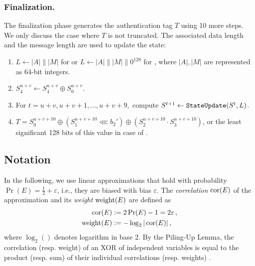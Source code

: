 \subsubsection{Finalization.}
The finalization phase generates the authentication tag $T$ using 10 more \StateUpdate{} steps. We only discuss the case where $T$ is not truncated. The associated data length and the message length are used to update the state:
\begin{enumerate}
\item $L \leftarrow |A| \mathrel\| |M|$ for \MORUS[640] or $L \leftarrow |A| \mathrel\| |M| \mathrel\|0^{128}$ for \MORUS[1280], where $|A|, |M|$ are represented as 64-bit integers.
\item $S^{u+v}_4 \leftarrow S^{u+v}_4 \oplus S^{u+v}_0.$
\item For $t = u+v, u+v+1, \ldots, u+v+9,$ compute
$S^{t+1} \leftarrow \texttt{StateUpdate}{} (S^t, L)$.
\item $T = S^{u+v+10}_0 \oplus (S^{u+v+10}_1 \lll b_2') \oplus ( S^{u+v+10}_2 \cdot S^{u+v+10}_3)$, or the least significant 128 bits of this value in case of \MORUS[1280].
\end{enumerate}

\subsection{Notation}
\label{subsec/Notation}

In the following, we use linear approximations \cite{eurocryptMatsui93}
that hold with probability $\Pr(E) = \frac{1}{2} + \varepsilon$, i.e., they are biased with bias $\varepsilon$.
The \emph{correlation} $\operatorname{cor}(E)$ of the approximation and its \emph{weight} $\operatorname{weight}(E)$ are defined as
\begin{align*}
\operatorname{cor}(E) &:= 2\Pr(E)-1 = 2 \varepsilon\,, \\
\operatorname{weight}(E) &:= -\log_2|\operatorname{cor}(E)|\,,
\end{align*}
where $\log_2()$ denotes logarithm in base 2. By the Piling-Up Lemma, the correlation (resp. weight) of an XOR of independent variables is equal to the product (resp. sum) of their individual correlations (resp. weights) \cite{eurocryptMatsui93}.

